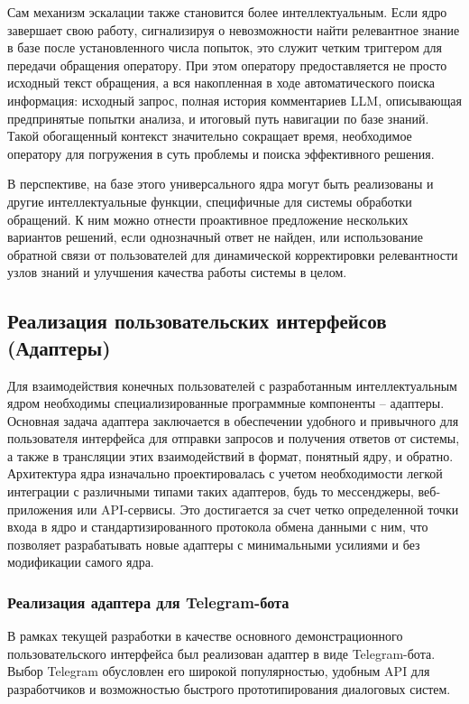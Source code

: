 Сам механизм эскалации также становится более интеллектуальным. Если ядро завершает свою работу, сигнализируя о невозможности найти релевантное знание в базе после установленного числа попыток, это служит четким триггером для передачи обращения оператору. При этом оператору предоставляется не просто исходный текст обращения, а вся накопленная в ходе автоматического поиска информация: исходный запрос, полная история комментариев LLM, описывающая предпринятые попытки анализа, и итоговый путь навигации по базе знаний. Такой обогащенный контекст значительно сокращает время, необходимое оператору для погружения в суть проблемы и поиска эффективного решения.

В перспективе, на базе этого универсального ядра могут быть реализованы и другие интеллектуальные функции, специфичные для системы обработки обращений. К ним можно отнести проактивное предложение нескольких вариантов решений, если однозначный ответ не найден, или использование обратной связи от пользователей для динамической корректировки релевантности узлов знаний и улучшения качества работы системы в целом.

\subsection{Реализация пользовательских интерфейсов (Адаптеры)}

Для взаимодействия конечных пользователей с разработанным интеллектуальным ядром необходимы специализированные программные компоненты – адаптеры. Основная задача адаптера заключается в обеспечении удобного и привычного для пользователя интерфейса для отправки запросов и получения ответов от системы, а также в трансляции этих взаимодействий в формат, понятный ядру, и обратно. Архитектура ядра изначально проектировалась с учетом необходимости легкой интеграции с различными типами таких адаптеров, будь то мессенджеры, веб-приложения или API-сервисы. Это достигается за счет четко определенной точки входа в ядро и стандартизированного протокола обмена данными с ним, что позволяет разрабатывать новые адаптеры с минимальными усилиями и без модификации самого ядра.

\subsubsection{Реализация адаптера для Telegram-бота}

В рамках текущей разработки в качестве основного демонстрационного пользовательского интерфейса был реализован адаптер в виде Telegram-бота. Выбор Telegram обусловлен его широкой популярностью, удобным API для разработчиков и возможностью быстрого прототипирования диалоговых систем.

